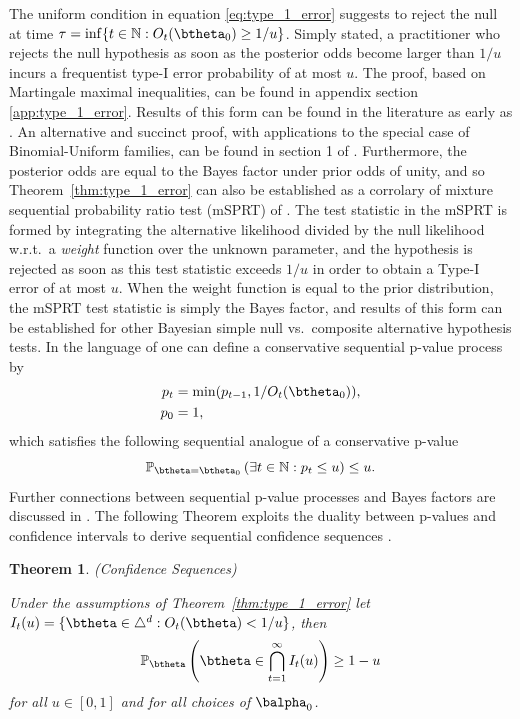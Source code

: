 \documentclass[11pt]{article}
\newtheorem{thm}{Theorem}[section]
\begin{document}
The uniform condition in equation \ref{eq:type_1_error} suggests to reject the null at time $\tau = \inf \lbrace t \in \mathbb{N}: O_t(\btheta_0) \geq 1/u \rbrace$.
Simply stated, a practitioner who rejects the null hypothesis as soon as the posterior odds become larger than $1/u$ incurs a frequentist type-I error probability of at most $u$.
The proof, based on Martingale maximal inequalities, can be found in appendix section \ref{app:type_1_error}.
Results of this form can be found in the literature as early as \cite{ville}.
An alternative and succinct proof, with applications to the special case of Binomial-Uniform families, can be found in section 1 of \cite{robbins}.
Furthermore, the posterior odds are equal to the Bayes factor under prior odds of unity, and so Theorem~\ref{thm:type_1_error} can also be established as a corrolary of mixture sequential probability ratio test (mSPRT) of \cite{wald}.
The test statistic in the mSPRT is formed by integrating the alternative likelihood divided by the null likelihood w.r.t.\ a \textit{weight} function over the unknown parameter, and the hypothesis is rejected as soon as this test statistic exceeds $1/u$ in order to obtain a Type-I error of at most $u$.
When the weight function is equal to the prior distribution, the mSPRT test statistic is simply the Bayes factor, and results of this form can be established for other Bayesian simple null vs.\ composite alternative hypothesis tests.
In the language of \cite{johari} one can define a conservative sequential p-value process by
\begin{align*}
  p_t &= \min(p_{t-1}, 1/O_t(\btheta_0)),\\
  p_0 &=1,
\end{align*}
which satisfies the following sequential analogue of a conservative p-value
\begin{equation}
  \label{eq:conservative_p_value}
  \mathbb{P}_{\btheta = \btheta_0}\left( \exists t \in \mathbb{N}: p_t \leq u \right) \leq u.
\end{equation}
Further connections between sequential p-value processes and Bayes factors are discussed in \cite{shafer}.
The following Theorem exploits the duality between p-values and confidence intervals to derive sequential confidence sequences .
\begin{thm}(Confidence Sequences)
  
  \label{thm:confidence_sequence}
  \noindent Under the assumptions of Theorem~\ref{thm:type_1_error} let $I_t(u) = \lbrace \btheta \in \triangle^d : O_t(\btheta) < 1/u  \rbrace$, then
\begin{equation}
  \label{eq:confidence_sequence}
  \mathbb{P}_{\btheta}\left( \btheta \in \bigcap_{t=1}^{\infty} I_t(u) \right) \geq 1- u
\end{equation}
for all $u \in [0,1]$ and for all choices of $\balpha_0$.

\end{thm}
\end{document}
